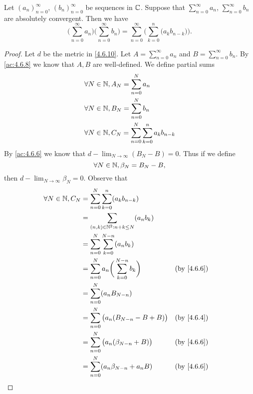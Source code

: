\begin{ac}\label{ac:4.6.9}
  Let \((a_n)_{n = 0}^\infty\), \((b_n)_{n = 0}^\infty\) be sequences in \(\mathbb{C}\).
  Suppose that \(\sum_{n = 0}^\infty a_n\), \(\sum_{n = 0}^\infty b_n\) are absolutely convergent.
  Then we have
  \[
    \bigg(\sum_{n = 0}^\infty a_n\bigg) \bigg(\sum_{n = 0}^\infty b_n\bigg) = \sum_{n = 0}^\infty \bigg(\sum_{k = 0}^n \big(a_k b_{n - k}\big)\bigg).
  \]
\end{ac}

\begin{proof}
  Let \(d\) be the metric in \cref{4.6.10}.
  Let \(A = \sum_{n = 0}^\infty a_n\) and \(B = \sum_{n = 0}^\infty b_n\).
  By \cref{ac:4.6.8} we know that \(A, B\) are well-defined.
  We define partial sums
  \begin{align*}
     & \forall N \in \mathbb{N}, A_N = \sum_{n = 0}^N a_n                          \\
     & \forall N \in \mathbb{N}, B_N = \sum_{n = 0}^N b_n                          \\
     & \forall N \in \mathbb{N}, C_N = \sum_{n = 0}^N \sum_{k = 0}^n a_k b_{n - k}
  \end{align*}
  By \cref{ac:4.6.6} we know that \(d - \lim_{N \to \infty} (B_N - B) = 0\).
  Thus if we define
  \[
    \forall N \in \mathbb{N}, \beta_N = B_N - B,
  \]
  then \(d - \lim_{N \to \infty} \beta_N = 0\).
  Observe that
  \begin{align*}
    \forall N \in \N, C_N & = \sum_{n = 0}^N \sum_{k = 0}^n (a_k b_{n - k})                                         \\
                          & = \sum_{(n, k) \in \N^2 : n + k \leq N} (a_n b_k)                                       \\
                          & = \sum_{n = 0}^N \sum_{k = 0}^{N - n} (a_n b_k)                                         \\
                          & = \sum_{n = 0}^N a_n \bigg(\sum_{k = 0}^{N - n} b_k\bigg)               &  & \by{4.6.6} \\
                          & = \sum_{n = 0}^N (a_n B_{N - n})                                                        \\
                          & = \sum_{n = 0}^N \big(a_n (B_{N - n} - B + B)\big)                      &  & \by{4.6.4} \\
                          & = \sum_{n = 0}^N \big(a_n (\beta_{N - n} + B)\big)                      &  & \by{4.6.6} \\
                          & = \sum_{n = 0}^N (a_n \beta_{N - n} + a_n B)                            &  & \by{4.6.6} \\

\end{align*}
\end{proof}
